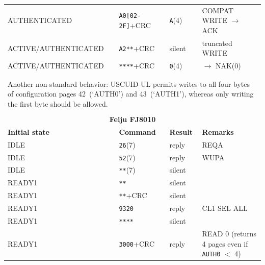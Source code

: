 \begin{longtable}{l l l l}
AUTHENTICATED        & \texttt{A0[02-2F]}+CRC              & \texttt{A}(4)            & COMPAT WRITE $\rightarrow$ ACK              \\
ACTIVE/AUTHENTICATED & \texttt{A2**}+CRC                   & silent          & truncated WRITE                             \\
ACTIVE/AUTHENTICATED & \texttt{****}+CRC                   & \texttt{0}(4)            & $\rightarrow$ NAK(0)         \\
\hline \\
\multicolumn{4}{l}{}\\
\multicolumn{4}{p{\textwidth}}{Another non-standard behavior: USCUID-UL permits writes to all four bytes of configuration pages 42~(`AUTH0') and 43~(`AUTH1'), whereas only writing the first byte should be allowed. 
}                                                                                  \\
\newpage
\multicolumn{4}{l}{}                                                                                              \\
\multicolumn{4}{c}{\textbf{Feiju FJ8010}}                                                                                  \\
\hline
\textbf{Initial state} & \textbf{Command} & \textbf{Result} & \textbf{Remarks} \\
\hline
IDLE                 & \texttt{26}(7)                      & reply           & REQA                                        \\
IDLE                 & \texttt{52}(7)                      & reply           & WUPA                                        \\
IDLE                 & \texttt{**}(7)                      & silent          &                                             \\
READY1               & \texttt{**}                         & silent          &                                             \\
READY1               & \texttt{**}+CRC                     & silent          &                                             \\
READY1               & \texttt{9320}                       & reply           & CL1 SEL ALL                                 \\
READY1               & \texttt{****}                       & silent          &                                             \\
READY1               & \texttt{3000}+CRC                   & reply           & READ 0 (returns 4 pages even if \texttt{AUTH0} $<$ 4) \\

\end{longtable}
